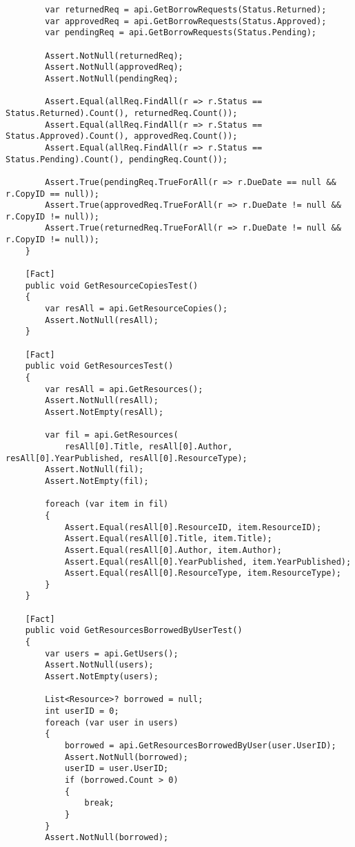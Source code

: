 \begin{verbatim}
        var returnedReq = api.GetBorrowRequests(Status.Returned);
        var approvedReq = api.GetBorrowRequests(Status.Approved);
        var pendingReq = api.GetBorrowRequests(Status.Pending);

        Assert.NotNull(returnedReq);
        Assert.NotNull(approvedReq);
        Assert.NotNull(pendingReq);

        Assert.Equal(allReq.FindAll(r => r.Status == Status.Returned).Count(), returnedReq.Count());
        Assert.Equal(allReq.FindAll(r => r.Status == Status.Approved).Count(), approvedReq.Count());
        Assert.Equal(allReq.FindAll(r => r.Status == Status.Pending).Count(), pendingReq.Count());

        Assert.True(pendingReq.TrueForAll(r => r.DueDate == null && r.CopyID == null));
        Assert.True(approvedReq.TrueForAll(r => r.DueDate != null && r.CopyID != null));
        Assert.True(returnedReq.TrueForAll(r => r.DueDate != null && r.CopyID != null));
    }

    [Fact]
    public void GetResourceCopiesTest()
    {
        var resAll = api.GetResourceCopies();
        Assert.NotNull(resAll);
    }

    [Fact]
    public void GetResourcesTest()
    {
        var resAll = api.GetResources();
        Assert.NotNull(resAll);
        Assert.NotEmpty(resAll);

        var fil = api.GetResources(
            resAll[0].Title, resAll[0].Author, resAll[0].YearPublished, resAll[0].ResourceType);
        Assert.NotNull(fil);
        Assert.NotEmpty(fil);

        foreach (var item in fil)
        {
            Assert.Equal(resAll[0].ResourceID, item.ResourceID);
            Assert.Equal(resAll[0].Title, item.Title);
            Assert.Equal(resAll[0].Author, item.Author);
            Assert.Equal(resAll[0].YearPublished, item.YearPublished);
            Assert.Equal(resAll[0].ResourceType, item.ResourceType);
        }
    }

    [Fact]
    public void GetResourcesBorrowedByUserTest()
    {
        var users = api.GetUsers();
        Assert.NotNull(users);
        Assert.NotEmpty(users);

        List<Resource>? borrowed = null;
        int userID = 0;
        foreach (var user in users)
        {
            borrowed = api.GetResourcesBorrowedByUser(user.UserID);
            Assert.NotNull(borrowed);
            userID = user.UserID;
            if (borrowed.Count > 0)
            {
                break;
            }
        }
        Assert.NotNull(borrowed);


\end{verbatim}
